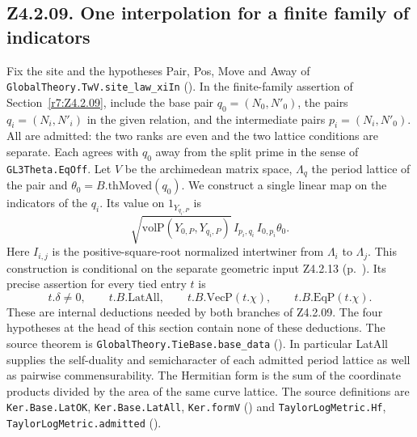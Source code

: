 \subsection{Z4.2.09. One interpolation for a finite family of indicators}\label{r8:Z4.2.09}
Fix the site and the hypotheses Pair, Pos, Move and Away of
\nolinkurl{GlobalTheory.TwV.site_law_xiIn}
().
In the finite-family assertion of Section~\ref{r7:Z4.2.09}, include the
base pair \(q_0=(N_0,N'_0)\), the pairs \(q_i=(N_i,N'_i)\) in the
given relation, and the intermediate pairs \(p_i=(N_i,N'_0)\).
All are admitted: the two ranks are even and the two lattice conditions
are separate. Each agrees with \(q_0\) away from the split prime in the
sense of \nolinkurl{GL3Theta.EqOff}. Let \(V\) be the archimedean
matrix space, \(\Lambda_q\) the period lattice of the pair and
\(\theta_0=B.\mathrm{thMoved}(q_0)\). We construct a single linear map
on the indicators of the \(q_i\). Its value on \(1_{Y_{q_i,P}}\) is
\[
 \sqrt{\mathrm{volP}(Y_{0,P},Y_{q_i,P})}\,
 I_{p_i,q_i}\,I_{0,p_i}\theta_0 .
\]
Here \(I_{i,j}\) is the positive-square-root normalized intertwiner
from \(\Lambda_i\) to \(\Lambda_j\).
This construction is conditional on the separate geometric input
Z4.2.13 (p.~\pageref{r8:Z4.2.13}). Its precise assertion for every tied
entry \(t\) is
\[
 t.\delta\ne0,\qquad t.B.\mathrm{LatAll},\qquad
 t.B.\mathrm{VecP}(t.\chi),\qquad t.B.\mathrm{EqP}(t.\chi).
\]
These are internal deductions needed by both branches of Z4.2.09.
The four hypotheses at the head of this section contain none of these
deductions. The source theorem is \nolinkurl{GlobalTheory.TieBase.base_data}
().
In particular LatAll supplies the self-duality and semicharacter
of each admitted period lattice as well as pairwise commensurability.
The Hermitian form is the sum of the coordinate products divided by the
area of the same curve lattice. The source definitions are
\nolinkurl{Ker.Base.LatOK}, \nolinkurl{Ker.Base.LatAll}, \nolinkurl{Ker.formV}
()
and \nolinkurl{TaylorLogMetric.Hf}, \nolinkurl{TaylorLogMetric.admitted}
().

